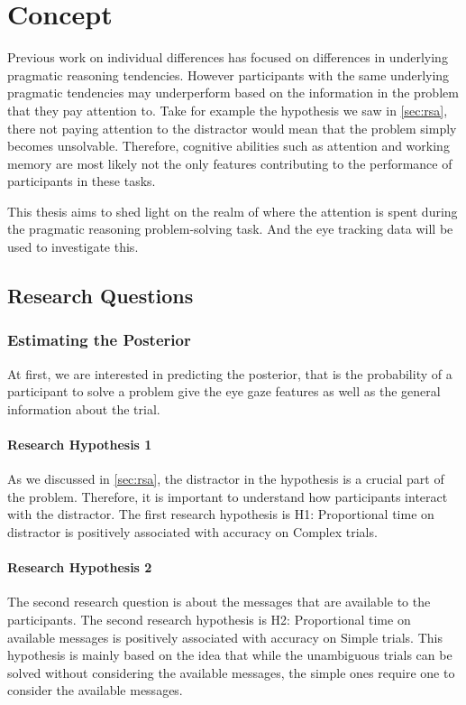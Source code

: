 ﻿\chapter{Concept}
 
Previous work on individual differences \cite{Franke_2016} has focused on differences in underlying pragmatic reasoning tendencies. However participants with the same underlying pragmatic tendencies may underperform based on the information in the problem that they pay attention to. Take for example the hypothesis we saw in \autoref{sec:rsa}, there not paying attention to the distractor would mean that the problem simply becomes unsolvable. Therefore, cognitive abilities such as attention and working memory are most likely not the only features contributing to the performance of participants in these tasks.

This thesis aims to shed light on the realm of where the attention is spent during the pragmatic reasoning problem-solving task. And the eye tracking data will be used to investigate this. 

\section{Research Questions}
\label{sec:research_questions}

\subsection{Estimating the Posterior}
\label{sec:posterior}
At first, we are interested in predicting the posterior, that is the probability of a participant to solve a problem give the eye gaze features as well as the general information about the trial.

\subsubsection{Research Hypothesis 1}
\label{sec:h1}
As we discussed in \autoref{sec:rsa}, the distractor in the hypothesis is a crucial part of the problem. Therefore, it is important to understand how participants interact with the distractor. The first research hypothesis is H1: Proportional time on distractor is positively associated with accuracy on Complex trials.

\subsubsection{Research Hypothesis 2}
\label{sec:h2}
The second research question is about the messages that are available to the participants. The second research hypothesis is H2: Proportional time on available messages is positively associated with accuracy on Simple trials. This hypothesis is mainly based on the idea that while the unambiguous trials can be solved without considering the available messages, the simple ones require one to consider the available messages.

